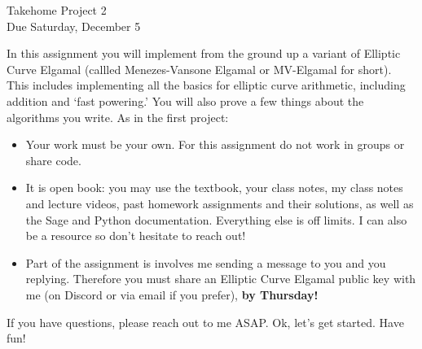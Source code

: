 \documentclass[11pt]{article}
\begin{document}
\begin{center}
\Large {Takehome Project 2}\\
\small {Due Saturday, December 5}
\end{center}
In this assignment you will implement from the ground up a variant of Elliptic Curve Elgamal (callled Menezes-Vansone Elgamal or MV-Elgamal for short).  This includes implementing all the basics for elliptic curve arithmetic, including addition and `fast powering.'  You will also prove a few things about the algorithms you write.  As in the first project:
\begin{itemize}
  \item{Your work must be your own.  For this assignment do not work in groups or share code.}
  \item{It is open book: you may use the textbook, your class notes, my class notes and lecture videos, past homework assignments and their solutions, as well as the Sage and Python documentation.  Everything else is off limits.  I can also be a resource so don't hesitate to reach out!}
  \item{Part of the assignment is involves me sending a message to you and you replying.  Therefore you must share an Elliptic Curve Elgamal public key with me (on Discord or via email if you prefer), \textbf{by Thursday!}}
\end{itemize}
If you have questions, please reach out to me ASAP.  Ok, let's get started.  Have fun!
\end{document}
